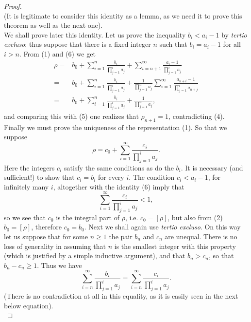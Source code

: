 \documentclass[12pt]{article}
\begin{document}
\begin{proof}
\begin{equation}
\end{equation}
(It is legitimate to consider this identity as a lemma, as we need it to prove this theorem as well as the next one).\\
We shall prove later this identity. Let us prove the inequality $b_i < a_i - 1$ by \emph{tertio excluso}; thus suppose that there is a fixed integer $n$ such that $b_i = a_i - 1$ for all $i > n$. From (1) and (6) we get
\begin{align*}
\rho ={}& b_0 + \sum_{i=1}^n \frac{b_i}{\prod_{j=1}^i a_j} + \sum_{i=n+1}^\infty \frac{a_i - 1}{\prod_{j=1}^i a_j} \\ 
     ={}& b_0 + \sum_{i=1}^n\frac{b_i}{\prod_{j=1}^i a_j} + \frac{1}{\prod_{j=1}^n a_j}\sum_{i=1}^\infty\frac{a_{n+i}-1}{\prod_{j=1}^i a_{n+j}} \\
     ={}& b_0 + \sum_{i=1}^n\frac{b_i}{\prod_{j=1}^i a_j} + \frac{1}{\prod_{j=1}^n a_j},
\end{align*}
and comparing this with (5) one realizes that $\rho_{n+1} = 1$, contradicting (4). \\
Finally we must prove the uniqueness of the representation (1). So that we suppose
\begin{equation*}
\rho = c_0 + \sum_{i=1}^\infty \frac{c_i}{\prod_{j=1}^i a_j}.
\end{equation*}
Here the integers $c_i$ satisfy the same conditions as do the $b_i$. It is necessary (and sufficient!) to show that $c_i = b_i$ for every $i$. The condition $c_i < a_i - 1$, for infinitely many $i$, altogether with the identity (6) imply that
\begin{equation*}
\sum_{i=1}^\infty \frac{c_i}{\prod_{j=1}^i a_j} < 1,
\end{equation*}
so we see that $c_0$ is the integral part of $\rho$, i.e. $c_0 = [\rho]$, but also from (2) $b_0 = [\rho]$, therefore $c_0 = b_0$. Next we shall again use \emph{tertio excluso}. On this way let us suppose that for some $n \geq 1$ the pair $b_n$ and $c_n$ are unequal. There is no loss of generality in assuming that $n$ is the smallest integer with this property (which is justified by a simple inductive argument), and that $b_n > c_n$, so that $b_n - c_n \geq 1$. Thus we have
\begin{equation*}
\sum_{i=n}^\infty \frac{b_i}{\prod_{j=1}^i a_j} = \sum_{i=n}^\infty \frac{c_i}{\prod_{j=1}^i a_j}.
\end{equation*}
(There is no contradiction at all in this equality, as it is easily seen in the next below equation). \\

\end{proof}
\end{document}
